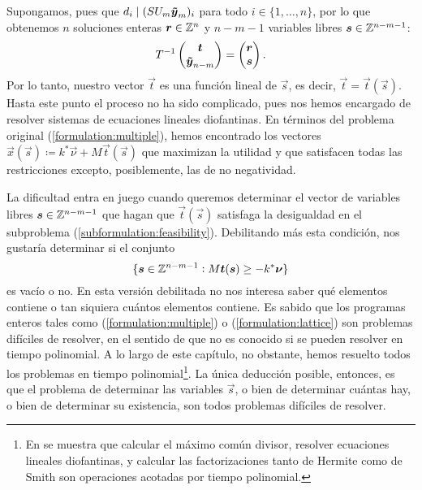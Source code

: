 Supongamos, pues que $d_i \mid (SU_m\boldsymbol{\tilde{y}}_{m})_i$ para todo $i \in \lbrace 1, \ldots,
n\rbrace$, por lo que obtenemos $n$ soluciones enteras $\boldsymbol{r} \in \mathbb{Z}^n$ y $n - m - 1$ variables
libres $\boldsymbol{s} \in \mathbb{Z}^{n-m-1}$:
\begin{equation*}
	T^{-1}\begin{pmatrix} \boldsymbol{t} \\ \boldsymbol{\tilde{y}}_{n-m} \end{pmatrix}
	=
	\begin{pmatrix} \boldsymbol{r} \\ \boldsymbol{s} \end{pmatrix}.
\end{equation*}
Por lo tanto, nuestro vector $\vec{t}$ es una función lineal de $\vec{s}$, es decir, $\vec{t} =
\vec{t}(\vec{s})$. Hasta este punto el proceso no ha sido complicado, pues nos hemos encargado de
resolver sistemas de ecuaciones lineales diofantinas. En términos del problema original
(\ref{formulation:multiple}), hemos encontrado los vectores $\vec{x}(\vec{s}) \coloneq
k^*\vec{\nu} + M\vec{t}(\vec{s})$ que maximizan la utilidad y que satisfacen todas las
restricciones excepto, posiblemente, las de no negatividad.

La dificultad entra en juego cuando queremos determinar el vector de variables libres $\boldsymbol{s} \in
\mathbb{Z}^{n-m-1}$ que hagan que $\vec{t}(\vec{s})$ satisfaga la desigualdad en el subproblema
(\ref{subformulation:feasibility}). Debilitando más esta condición, nos gustaría determinar si el
conjunto
\begin{equation*}
	\lbrace \boldsymbol{s} \in \mathbb{Z}^{n-m-1} \vcentcolon M\boldsymbol{t}(\boldsymbol{s}) \geq -k^*\boldsymbol{\nu} \rbrace
\end{equation*}
es vacío o no. En esta versión debilitada no nos interesa saber qué elementos contiene o tan
siquiera cuántos elementos contiene. Es sabido que los programas enteros tales como
(\ref{formulation:multiple}) o (\ref{formulation:lattice}) son problemas difíciles de resolver, en
el sentido de que no es conocido si se pueden resolver en tiempo polinomial. A lo largo de este
capítulo, no obstante, hemos resuelto todos los problemas en tiempo polinomial\footnote{En
	\cite{alex} se muestra que calcular el máximo común divisor, resolver ecuaciones lineales
	diofantinas, y calcular las factorizaciones tanto de Hermite como de Smith son operaciones
	acotadas por tiempo polinomial.}.
La única deducción posible, entonces, es que el problema de determinar las variables $\vec{s}$, o
bien de determinar cuántas hay, o bien de determinar su existencia, son todos problemas difíciles de
resolver.


